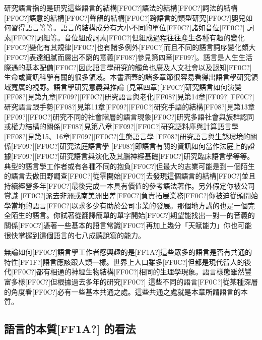 研究語言指的是研究這些語言的結構[FF0C?]語法的結構[FF0C?]詞法的結構[FF0C?]語意的結構[FF0C?]聲韻的結構[FF0C?]跨語言的類型研究[FF0C?]嬰兒如何習得語言等等。語言的結構成分有大小不同的單位[FF0C?]諸如音位[FF0C?] 詞素[FF0C?]詞組等。音位組成詞素[FF0C?]但組成過程往往產生各種有趣的變化[FF0C?]變化有其規律[FF0C?]也有諸多例外[FF0C?]而且不同的語言詞序變化頗大[FF0C?]表達細膩而層出不窮的意義[FF08?]參見第四章[FF09?]。語言是人生生活際遇的基本配備[FF0C?]因此語言學研究的觸角也廣及人文社會以及認知[FF0C?]生命或資訊科學有關的很多領域。本書涵蓋的諸多章節很容易看得出語言學研究領域寬廣的視野。語言學研究意義與推論 (見第四章)[FF0C?]研究語言如何演變[FF08?]見第九章[FF09?][FF0C?]研究語言與老化[FF08?]見第14章[FF09?][FF0C?]研究語言跟手勢[FF08?]見第11章[FF09?][FF0C?]研究手語的結構[FF08?]見第13章[FF09?][FF0C?]研究不同的社會階層的語言現象[FF0C?]研究多語社會與族群認同或權力結構的關係[FF08?]見第八章[FF09?][FF0C?]研究語料庫與計算語言學[FF08?]見第15、16章[FF09?][FF0C?]生態語言學 [FF08?]研究語言與生態環境的關係[FF09?][FF0C?]研究法庭語言學 [FF08?]即語言有關的資訊如何當作法庭上的證據[FF09?][FF0C?]研究語言與演化及其腦神經基礎[FF0C?]研究臨床語言學等等。典型的語言學工作者或有各種不同的抱負[FF0C?]但最大的志業可能是到一個陌生的語言去做田野調查[FF0C?]從零開始[FF0C?]去發現這個語言的結構[FF0C?]並且持續經營多年[FF0C?]最後完成一本具有價值的參考語法著作。另外假定你被公司賞識 [FF0C?]派去非洲或南美洲出差[FF0C?]負責拓展業務[FF0C?]你被迫從頭開始學當地的語言[FF0C?]以求多少有助於公司事業的發展。那個地方講的也是一個完全陌生的語言。你試著從翻譯簡單的單字開始[FF0C?]期望能找出一對一的音義的關係[FF0C?]憑著一些基本的語言常識[FF0C?]再加上幾分「天賦能力」你也可能很快掌握到這個語言的七八成聽說寫的能力。

無論如何[FF0C?]語言學工作者感興趣的是[FF1A?]這些眾多的語言是否有共通的特性[FF1F?]語言應該跟人類一樣。世界上人口雖多[FF0C?]但都是現代智人的後代[FF0C?]都有相通的神經生物結構[FF0C?]相同的生理學現象。語言樣態雖然豐富多樣[FF0C?]但根據過去多年的研究[FF0C?] 這些不同的語言[FF0C?]從某種深層的角度看[FF0C?]必有一些基本共通之處。這些共通之處就是本章所謂語言的本質。

\subsection{語言的本質[FF1A?]\parencite{Hockett1960} 的看法}  %

